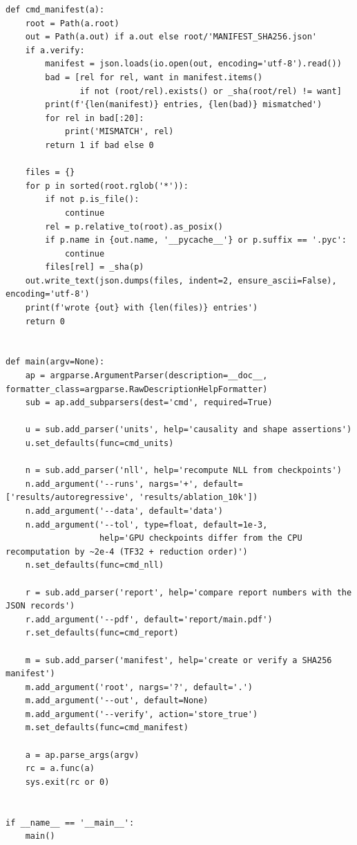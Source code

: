 \begin{lstlisting}
def cmd_manifest(a):
    root = Path(a.root)
    out = Path(a.out) if a.out else root/'MANIFEST_SHA256.json'
    if a.verify:
        manifest = json.loads(io.open(out, encoding='utf-8').read())
        bad = [rel for rel, want in manifest.items()
               if not (root/rel).exists() or _sha(root/rel) != want]
        print(f'{len(manifest)} entries, {len(bad)} mismatched')
        for rel in bad[:20]:
            print('MISMATCH', rel)
        return 1 if bad else 0

    files = {}
    for p in sorted(root.rglob('*')):
        if not p.is_file():
            continue
        rel = p.relative_to(root).as_posix()
        if p.name in {out.name, '__pycache__'} or p.suffix == '.pyc':
            continue
        files[rel] = _sha(p)
    out.write_text(json.dumps(files, indent=2, ensure_ascii=False), encoding='utf-8')
    print(f'wrote {out} with {len(files)} entries')
    return 0


def main(argv=None):
    ap = argparse.ArgumentParser(description=__doc__, formatter_class=argparse.RawDescriptionHelpFormatter)
    sub = ap.add_subparsers(dest='cmd', required=True)

    u = sub.add_parser('units', help='causality and shape assertions')
    u.set_defaults(func=cmd_units)

    n = sub.add_parser('nll', help='recompute NLL from checkpoints')
    n.add_argument('--runs', nargs='+', default=['results/autoregressive', 'results/ablation_10k'])
    n.add_argument('--data', default='data')
    n.add_argument('--tol', type=float, default=1e-3,
                   help='GPU checkpoints differ from the CPU recomputation by ~2e-4 (TF32 + reduction order)')
    n.set_defaults(func=cmd_nll)

    r = sub.add_parser('report', help='compare report numbers with the JSON records')
    r.add_argument('--pdf', default='report/main.pdf')
    r.set_defaults(func=cmd_report)

    m = sub.add_parser('manifest', help='create or verify a SHA256 manifest')
    m.add_argument('root', nargs='?', default='.')
    m.add_argument('--out', default=None)
    m.add_argument('--verify', action='store_true')
    m.set_defaults(func=cmd_manifest)

    a = ap.parse_args(argv)
    rc = a.func(a)
    sys.exit(rc or 0)


if __name__ == '__main__':
    main()
\end{lstlisting}

